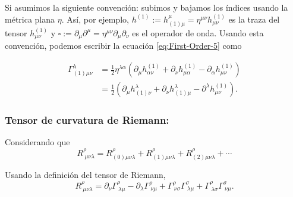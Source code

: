 \documentclass[letterpaper,11pt]{article}
\begin{document}
Si asumimos la siguiente convención: subimos y bajamos los índices usando la métrica plana $\eta$. Así, por ejemplo, $h^{(1)} := h_{(1)\mu}^{\mu} = \eta^{\mu\nu} h_{\mu\nu}^{(1)}$ es la traza del tensor $h_{\mu\nu}^{(1)}$ y $\square := \partial_{\mu}\partial^{\mu} = \eta^{\mu\nu}\partial_{\mu}\partial_{\nu}$ es el operador de onda. Usando esta convención, podemos escribir la ecuación \eqref{eq:First-Order-5} como
\begin{shaded}
\begin{align}
\Gamma^{\lambda}_{(1) \mu\nu} &= \frac{1}{2}  \eta^{\lambda \alpha} \left( \partial_{\mu} h^{(1)}_{\alpha\nu} + \partial_{\nu} h^{(1)}_{\mu\alpha} - \partial_{\alpha} h^{(1)}_{\mu\nu} \right) \nonumber\\
&= \frac{1}{2} \left(\partial_{\mu} h_{(1)\nu}^{\lambda} + \partial_{\nu} h_{(1)\mu}^{\lambda} - \partial^{\lambda} h_{\mu\nu}^{(1)} \right). \label{eq:First-Order-6}
\end{align}
\end{shaded}

\subsubsection*{Tensor de curvatura de Riemann:}

Considerando que 
\begin{equation}
R_{\ \mu\nu\lambda}^{\rho} = R_{(0) \mu\nu\lambda}^{\rho} + R_{(1) \mu\nu\lambda}^{\rho} + R_{(2) \mu\nu\lambda}^{\rho} + \cdots 
\end{equation}

Usando la definición del tensor de Riemann, 
\begin{equation}
R_{\ \mu\nu\lambda}^{\rho} = \partial_{\nu} \Gamma^{\rho}_{\ \lambda \mu} - \partial_{\lambda} \Gamma^{\rho}_{\ \nu \mu} + \Gamma^{\rho}_{\ \nu\sigma} \Gamma^{\sigma}_{\ \lambda\mu} + \Gamma^{\rho}_{\ \lambda\sigma} \Gamma^{\sigma}_{\ \nu\mu}.
\end{equation}
\end{document}

